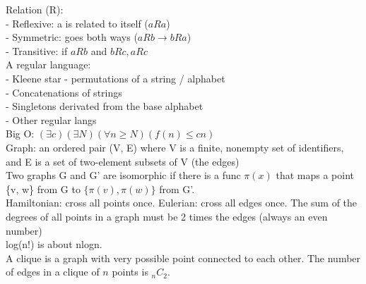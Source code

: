 \documentclass[10pt]{report}
\begin{document}
Relation (R): \\
- Reflexive: a is related to itself ($a R a$) \\
- Symmetric: goes both ways ($a R b \rightarrow b R a$) \\
- Transitive: if $a R b$ and $b R c, a R c$ \\

A regular language: \\
- Kleene star - permutations of a string / alphabet \\
- Concatenations of strings \\
- Singletons derivated from the base alphabet \\
- Other regular langs \\

Big O: $(\exists c)(\exists N)(\forall n \geq N)(f(n) \leq cn)$ \\

Graph: an ordered pair (V, E) where V is a finite, nonempty set of identifiers, and E is a set of two-element subsets of V (the edges) \\
Two graphs G and G' are isomorphic if there is a func $\pi(x)$ that maps a point \{v, w\} from G to $\{\pi(v), \pi(w)\}$ from G'. \\
Hamiltonian: cross all points once. Eulerian: cross all edges once. The sum of the degrees of all points in a graph must be 2 times the edges (always an even number) \\
log(n!) is about nlogn. \\
A clique is a graph with very possible point connected to each other. The number of edges in a clique of $n$ points is $_nC_2$.
\end{document}
